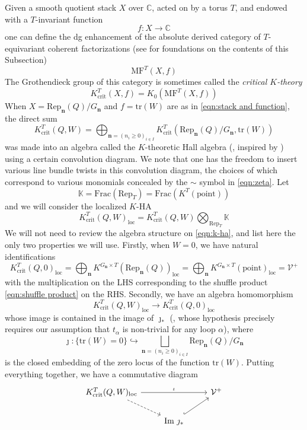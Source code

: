 \documentclass{amsart}
\def\BC{{\mathbb{C}}}
\def\BK{{\mathbb{K}}}
\def\CV{{\mathcal{V}}}
\def\bn{{\boldsymbol{n}}}
\begin{document}
Given a smooth quotient stack $X$ over $\BC$, acted on by a torus $T$, and endowed with a $T$-invariant function 
\[
f : X \rightarrow \BC
\]
one can define the dg enhancement of the absolute derived category of $T$-equivariant coherent factorizations (see \cite{P2} for foundations on the contents of this Subsection)
\[
\text{MF}^T(X,f)
\]
The Grothendieck group of this category is sometimes called the \emph{critical $K$-theory}
\[
K_{\text{crit}}^T(X,f) = K_0 ( \text{MF}^T(X,f) )
\]
When $X = \text{Rep}_{\bn}(Q)/G_{\bn}$ and $f = \text{tr}(W)$ are as in \eqref{eqn:stack and function}, the direct sum 
\begin{equation}
\label{eqn:k-ha}
K_{\text{crit}}^T(Q,W) = \bigoplus_{\bn = (n_i \geq 0)_{i \in I}} K_{\text{crit}}^T \left( \text{Rep}_{\bn}(Q)/G_{\bn}, \text{tr}(W) \right) 
\end{equation}
was made into an algebra called the $K$-theoretic Hall algebra (\cite{P}, inspired by \cite{KS}) using a certain convolution diagram. We note that one has the freedom to insert various line bundle twists in this convolution diagram, the choices of which correspond to various monomials concealed by the $\sim$ symbol in \eqref{eqn:zeta}. Let
\[
\BK = \text{Frac}(\text{Rep}_T) = \text{Frac} \left(K^T(\text{point})\right) 
\]
and we will consider the localized $K$-HA
\[
K_{\text{crit}}^T(Q,W)_{\text{loc}} = K_{\text{crit}}^T(Q,W) \bigotimes_{\text{Rep}_T} \BK 
\]
We will not need to review the algebra structure on \eqref{eqn:k-ha}, and list here the only two properties we will use. Firstly, when $W = 0$, we have natural identifications
\[
K_{\text{crit}}^T(Q,0)_{\text{loc}} = \bigoplus_{\bn} K^{G_{\bn} \times T} \left( \text{Rep}_{\bn}(Q) \right)_{\text{loc}} = \bigoplus_{\bn} K^{G_{\bn} \times T} \left( \text{point} \right)_{\text{loc}} = \CV^+
\]
with the multiplication on the LHS corresponding to the shuffle product \eqref{eqn:shuffle product} on the RHS. Secondly, we have an algebra homomorphism
\[
K_{\text{crit}}^T(Q,W)_{\text{loc}} \longrightarrow K_{\text{crit}}^T(Q,0)_{\text{loc}}
\]
whose image is contained in the image of $\jmath_*$ (\cite[Proposition 3.6]{P2}, whose hypothesis precisely requires our assumption that $t_\alpha$ is non-trivial for any loop $\alpha$), where 
\[
\jmath : \{\text{tr}(W) = 0\} \hookrightarrow \bigsqcup_{\bn = (n_i\geq 0)_{i \in I}} \text{Rep}_{\bn}(Q)/G_{\bn}
\]
is the closed embedding of the zero locus of the function $\text{tr}(W)$. Putting everything together, we have a commutative diagram 
\begin{equation}
\label{eqn:commutative diagram}
\begin{tikzcd}
K_{\text{crit}}^T(Q,W)_{\text{loc}} \arrow[rr, "\iota"] \arrow[dr, dashed] && \CV^+ \\
& \text{Im } \jmath_* \arrow[ur, hook] &
\end{tikzcd}
\end{equation}
\end{document}
